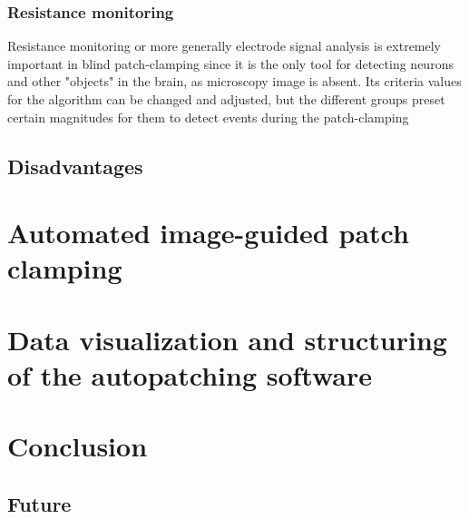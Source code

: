 \documentclass[12pt,a4paper]{report}
\begin{document}
\subsection{Resistance monitoring}
Resistance monitoring or more generally electrode signal analysis is extremely important in blind patch-clamping since it is the only tool for detecting neurons and other "objects" in the brain, as microscopy image is absent. Its criteria values for the algorithm can be changed and adjusted, but the different groups preset certain magnitudes for them to detect events during the patch-clamping

\section{Disadvantages}


\chapter{Automated image-guided patch clamping}

\chapter{Data visualization and structuring of the autopatching software}

\chapter{Conclusion}

\section{Future}

\printbibliography
\end{document}
